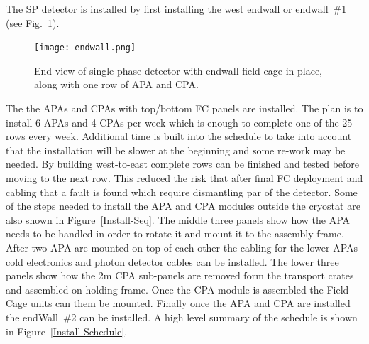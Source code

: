 The SP detector is installed by first installing the west endwall or
endwall~\#1 (see Fig.~\ref{fig:endwall}).
\begin{figure}[htbp]
\begin{center}
\texttt{[image: endwall.png]}
\caption{End view of single phase detector with endwall field cage in
  place, along with one row of APA and CPA.}
\label{fig:endwall}
\end{center}
\end{figure}
The the APAs and
CPAs with top/bottom FC panels are installed. The plan is to install 6
APAs and 4 CPAs per week which is enough to complete one of the 25
rows every week. Additional time is built into the schedule to take
into account that the installation will be slower at the beginning and
some re-work may be needed. By building west-to-east complete rows can
be finished and tested before moving to the next row. This reduced the
risk that after final FC deployment and cabling that a fault is found
which require dismantling par of the detector. Some of the steps
needed to install the APA and CPA modules outside the cryostat are
also shown in Figure~\ref{Install-Seq}.  The middle three panels show
how the APA needs to be handled in order to rotate it and mount it to
the assembly frame. After two APA are mounted on top of each other the
cabling for the lower APAs cold electronics and photon detector cables
can be installed. The lower three panels show how the 2m CPA
sub-panels are removed form the transport crates and assembled on
holding frame. Once the CPA module is assembled the Field Cage units
can them be mounted. Finally once the APA and CPA are installed the
endWall~\#2 can be installed. A high level summary of the schedule is
shown in Figure~\ref{Install-Schedule}.
